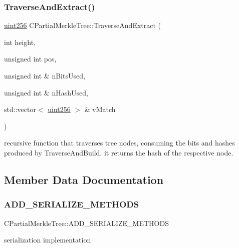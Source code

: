 \subsubsection{\texorpdfstring{Traverse\+And\+Extract()}{TraverseAndExtract()}}
{\footnotesize\ttfamily \mbox{\hyperlink{classuint256}{uint256}} C\+Partial\+Merkle\+Tree\+::\+Traverse\+And\+Extract (\begin{DoxyParamCaption}\item[{int}]{height,  }\item[{unsigned int}]{pos,  }\item[{unsigned int \&}]{n\+Bits\+Used,  }\item[{unsigned int \&}]{n\+Hash\+Used,  }\item[{std\+::vector$<$ \mbox{\hyperlink{classuint256}{uint256}} $>$ \&}]{v\+Match }\end{DoxyParamCaption})\hspace{0.3cm}{\ttfamily [protected]}}

recursive function that traverses tree nodes, consuming the bits and hashes produced by Traverse\+And\+Build. it returns the hash of the respective node. 

\subsection{Member Data Documentation}
\mbox{\label{class_c_partial_merkle_tree_ae218db8103edb6672fe0d642535c7490}} 
\subsubsection{\texorpdfstring{A\+D\+D\+\_\+\+S\+E\+R\+I\+A\+L\+I\+Z\+E\+\_\+\+M\+E\+T\+H\+O\+DS}{ADD\_SERIALIZE\_METHODS}}
{\footnotesize\ttfamily C\+Partial\+Merkle\+Tree\+::\+A\+D\+D\+\_\+\+S\+E\+R\+I\+A\+L\+I\+Z\+E\+\_\+\+M\+E\+T\+H\+O\+DS}

serialization implementation \mbox{\label{class_c_partial_merkle_tree_a24bb0d9d17d6001dcfbca4d550c64ba3}} 
